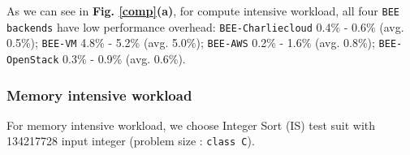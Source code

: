 


As we can see in \textbf{Fig. \ref{comp}(a)}, for compute intensive workload, all four \texttt{BEE backends} have low performance overhead: \texttt{BEE-Charliecloud} 0.4\% - 0.6\% (avg. 0.5\%); \texttt{BEE-VM} 4.8\% - 5.2\% (avg. 5.0\%); \texttt{BEE-AWS} 0.2\% - 1.6\% (avg. 0.8\%); \texttt{BEE-OpenStack} 0.3\% - 0.9\% (avg. 0.6\%).
    
\subsubsection{Memory intensive workload}
For memory intensive workload, we choose Integer Sort  (IS) test suit with 134217728 input integer (problem size : \texttt{class C}). 

